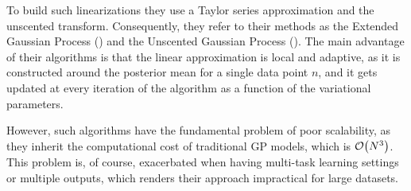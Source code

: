 To build such linearizations they use a Taylor series approximation and the
unscented transform.
Consequently, they refer to their methods  as the Extended Gaussian Process (\egp) and 
the Unscented Gaussian Process (\ugp). 
The main advantage of their algorithms is that the linear
approximation is local and adaptive, as it is constructed around the posterior mean for a
single data point $n$, and it gets updated at every iteration of the algorithm as a function
of the variational parameters. 

However, such algorithms have the fundamental problem of poor scalability, as they 
inherit the computational cost of traditional GP models, which is $\mathcal{O}\!\left({{N^3}}\right)$. This 
problem is, of course, exacerbated when having multi-task learning settings or multiple
outputs, which renders their approach impractical for large datasets.  


